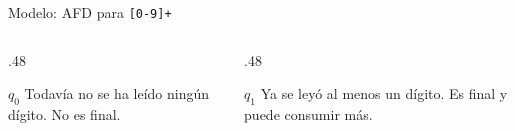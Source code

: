 \documentclass[11pt,spanish]{beamer}
\begin{document}
\begin{frame}{Modelo: AFD para \texttt{[0-9]+}}
\vfill

\begin{center}
\end{center}

\bigskip

\begin{columns}[T,onlytextwidth]
\begin{column}{.48\textwidth}
\begin{block}{\(q_0\)}
Todavía no se ha leído ningún dígito. No es final.
\end{block}
\end{column}
\begin{column}{.48\textwidth}
\begin{block}{\(q_1\)}
Ya se leyó al menos un dígito. Es final y puede consumir más.
\end{block}
\end{column}
\end{columns}

\vfill
\end{frame}
\end{document}
